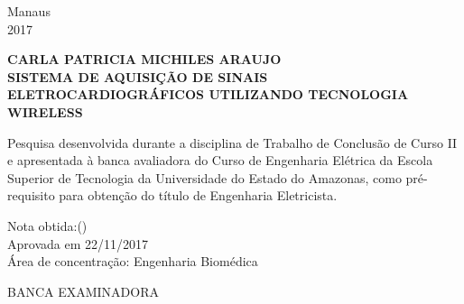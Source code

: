 \documentclass[12pt, a4paper]{article}
\newcommand{\bigsize}{\fontsize{12pt}{20pt}\selectfont}
\begin{document}
\vspace*{\fill}
\begin{center}
Manaus \\ 2017
\end{center}





\newpage
\thispagestyle{empty}




\newpage
\thispagestyle{empty}
\begin{center}


\textbf{ {\bigsize CARLA PATRICIA MICHILES ARAUJO} \\[50pt] }
\textbf{ {\bigsize SISTEMA DE AQUISIÇÃO DE SINAIS ELETROCARDIOGRÁFICOS UTILIZANDO TECNOLOGIA WIRELESS}  \\[50pt] }
\end{center}
\hspace*{8cm}
\begin{flushright}
\begin{minipage}{8cm}
\begin{singlespace}
Pesquisa desenvolvida durante a disciplina de Trabalho de Conclusão de Curso II e apresentada à banca avaliadora do Curso de Engenharia Elétrica da Escola Superior de Tecnologia da Universidade do Estado do Amazonas, como pré-requisito para obtenção do título de Engenharia Eletricista.\\[30pt]
\end{singlespace}
\end{minipage}
\end{flushright}
\begin{center}
Nota obtida:\uline{\hspace{1cm}}(\uline{\hspace{8cm}})
\newline \\
Aprovada em 22/11/2017
\newline\\
Área de concentração: Engenharia Biomédica \,\,\,\,\,\,\,\,\,\,\,\,\,\,\,\,\,\,\,
\end{center}
\vspace{1.2cm}
\begin{center}
BANCA EXAMINADORA
\end{center}
\vspace{1.0cm}
\end{document}
